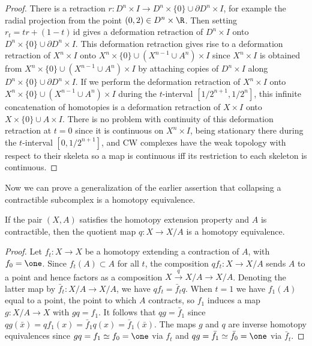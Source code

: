 \begin{proof}
There is a retraction $r : D^n \times I \to D^n \times \{0\} \cup \partial D^n \times I$, for example the
radial projection from the point $(0,2) \in D^n \times \R$. Then setting
$r_t = tr + (1-t)\,\mathrm{id}$ gives a deformation retraction of $D^n \times I$ onto
$D^n \times \{0\} \cup \partial D^n \times I$. This deformation retraction gives rise to a deformation
retraction of $X^n \times I$ onto $X^n \times \{0\} \cup (X^{n-1} \cup A^n) \times I$ since
$X^n \times I$ is obtained from $X^n \times \{0\} \cup (X^{n-1} \cup A^n) \times I$ by attaching copies
of $D^n \times I$ along $D^n \times \{0\} \cup \partial D^n \times I$. If we perform the deformation
retraction of $X^n \times I$ onto $X^n \times \{0\} \cup (X^{n-1} \cup A^n) \times I$ during the
$t$-interval $[1/2^{n+1}, 1/2^n]$, this infinite concatenation of homotopies is a
deformation retraction of $X \times I$ onto $X \times \{0\} \cup A \times I$. There is no problem
with continuity of this deformation retraction at $t = 0$ since it is continuous on
$X^n \times I$, being stationary there during the $t$-interval $[0, 1/2^{n+1}]$, and CW
complexes have the weak topology with respect to their skeleta so a map is continuous
iff its restriction to each skeleton is continuous.
\end{proof}



Now we can prove a generalization of the earlier assertion that collapsing a
contractible subcomplex is a homotopy equivalence.

\begin{proposition}
\label{prop:quotient-by-contractible-hep-homotopy-equiv}
\leanok
{}
If the pair $(X,A)$ satisfies the homotopy extension property and $A$ is
contractible, then the quotient map $q : X \to X/A$ is a homotopy equivalence.
\end{proposition}

\begin{proof}
\leanok
Let $f_t : X \to X$ be a homotopy extending a contraction of $A$, with $f_0 = \one$.
Since $f_t(A) \subset A$ for all $t$, the composition $qf_t : X \to X/A$ sends $A$ to a point
and hence factors as a composition $X \xrightarrow{q} X/A \to X/A$. Denoting the latter
map by $\bar f_t : X/A \to X/A$, we have $qf_t = \bar f_t q$. When $t=1$ we have $f_1(A)$
equal to a point, the point to which $A$ contracts, so $f_1$ induces a map $g : X/A \to X$
with $gq = f_1$. It follows that $qg = \bar f_1$ since
$qg(\bar x) = q f_1(x) = \bar f_1 q(x) = \bar f_1(\bar x)$. The maps $g$ and $q$ are inverse
homotopy equivalences since $gq = f_1 \simeq f_0 = \one$ via $f_t$ and
$qg = \bar f_1 \simeq \bar f_0 = \one$ via $\bar f_t$.
\end{proof}

